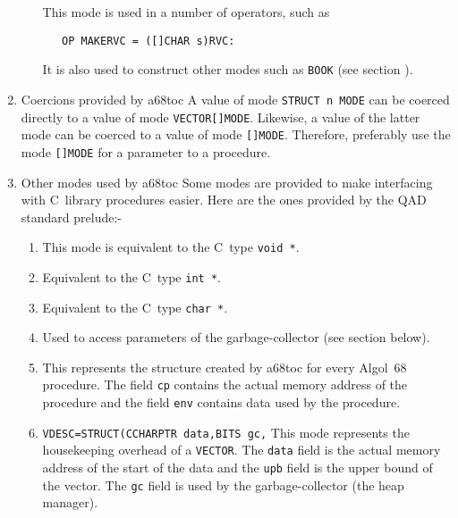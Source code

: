 \begin{enumerate}
\begin{enumerate}
This mode is used in a number of operators, such as
\begin{verbatim}
   OP MAKERVC = ([]CHAR s)RVC:
\end{verbatim}
\noindent
It is also used to construct other modes such as \verb|BOOK| (see
section ).
\end{enumerate}
\item Coercions provided by a68toc\newline
A value of mode \verb|STRUCT n MODE| can be coerced directly to a value
of mode \verb|VECTOR[]MODE|. Likewise, a value of the latter mode can
be coerced to a value of mode \verb|[]MODE|. Therefore, preferably use
the mode \verb|[]MODE| for a parameter to a procedure.
\item Other modes used by a68toc\newline
Some modes are provided to make interfacing with C~library procedures
easier. Here are the ones provided by the QAD standard prelude:-
\begin{enumerate}
\item {}\newline
This mode is equivalent to the C~type \verb|void *|.
\item {}\newline
Equivalent to the C~type \verb|int *|.
\item {}\newline
Equivalent to the C~type \verb|char *|.
\item {}\newline
Used to access parameters of the garbage-coll\-ector (see section
 below).
\item {}
\newline
This represents the structure created by a68toc for every Algol~68
procedure. The field \verb|cp| contains the actual memory address of
the procedure and the field \verb|env| contains data used by the
procedure.
\item \verb|VDESC=STRUCT(CCHARPTR data,BITS gc,|\newline
{}\newline
This mode represents the housekeeping overhead of a \verb|VECTOR|.
The \verb|data| field is the actual memory address of the start of
the data and the \verb|upb| field is the upper bound of the vector.
The \verb|gc| field is used by the garbage-collector (the heap
manager).
\end{enumerate}
\end{enumerate}

